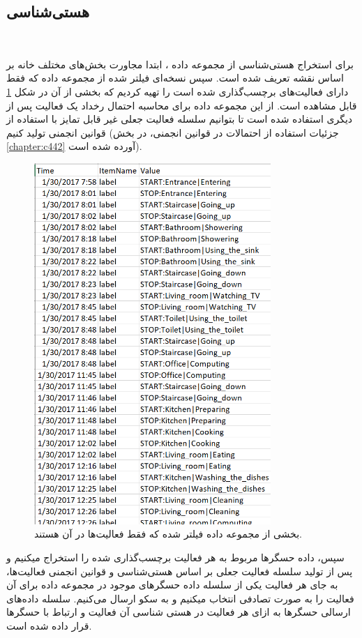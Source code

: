 \subsection{هستی‌شناسی}‌

برای استخراج هستی‌شناسی از مجموعه داده ، ابتدا مجاورت بخش‌های مختلف خانه بر اساس نقشه تعریف شده است. سپس نسخه‌ای فیلتر شده از مجموعه داده که فقط دارای فعالیت‌های برچسب‌گذاری شده است را تهیه کردیم که بخشی از آن در شکل \ref{fig:fO4H4} قابل مشاهده است. از این مجموعه داده برای محاسبه احتمال رخداد یک فعالیت پس از دیگری استفاده شده است تا بتوانیم سلسله فعالیت جعلی غیر قابل تمایز با استفاده از قوانین انجمنی تولید کنیم (جزئیات استفاده از احتمالات در قوانین انجمنی، در بخش \ref{chapter:c442} آورده شده است). 

\begin{figure}[H]
\centerline{\includegraphics[width=0.8\textwidth]{figs/fO4H4.png}}
\caption{بخشی از مجموعه داده فیلتر شده که فقط فعالیت‌ها در آن هستند.}
\label{fig:fO4H4}
\end{figure}

سپس، داده حسگرها مربوط به هر فعالیت برچسب‌گذاری شده را استخراج میکنیم و پس از تولید سلسله فعالیت جعلی بر اساس هستی‌شناسی و  قوانین انجمنی فعالیت‌ها، به جای هر فعالیت یکی از سلسله داده حسگرهای موجود در مجموعه داده برای آن فعالیت را به صورت تصادفی انتخاب میکنیم و به سکو ارسال می‌کنیم. سلسله داده‌های ارسالی حسگرها به ازای هر فعالیت در هستی ‌شناسی آن فعالیت و ارتباط با حسگرها قرار داده شده است.

